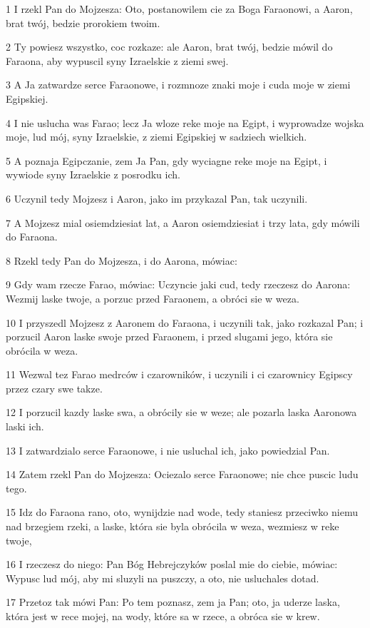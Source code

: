 \par 1 I rzekl Pan do Mojzesza: Oto, postanowilem cie za Boga Faraonowi, a Aaron, brat twój, bedzie prorokiem twoim.
\par 2 Ty powiesz wszystko, coc rozkaze: ale Aaron, brat twój, bedzie mówil do Faraona, aby wypuscil syny Izraelskie z ziemi swej.
\par 3 A Ja zatwardze serce Faraonowe, i rozmnoze znaki moje i cuda moje w ziemi Egipskiej.
\par 4 I nie uslucha was Farao; lecz Ja wloze reke moje na Egipt, i wyprowadze wojska moje, lud mój, syny Izraelskie, z ziemi Egipskiej w sadziech wielkich.
\par 5 A poznaja Egipczanie, zem Ja Pan, gdy wyciagne reke moje na Egipt, i wywiode syny Izraelskie z posrodku ich.
\par 6 Uczynil tedy Mojzesz i Aaron, jako im przykazal Pan, tak uczynili.
\par 7 A Mojzesz mial osiemdziesiat lat, a Aaron osiemdziesiat i trzy lata, gdy mówili do Faraona.
\par 8 Rzekl tedy Pan do Mojzesza, i do Aarona, mówiac:
\par 9 Gdy wam rzecze Farao, mówiac: Uczyncie jaki cud, tedy rzeczesz do Aarona: Wezmij laske twoje, a porzuc przed Faraonem, a obróci sie w weza.
\par 10 I przyszedl Mojzesz z Aaronem do Faraona, i uczynili tak, jako rozkazal Pan; i porzucil Aaron laske swoje przed Faraonem, i przed slugami jego, która sie obrócila w weza.
\par 11 Wezwal tez Farao medrców i czarowników, i uczynili i ci czarownicy Egipscy przez czary swe takze.
\par 12 I porzucil kazdy laske swa, a obrócily sie w weze; ale pozarla laska Aaronowa laski ich.
\par 13 I zatwardzialo serce Faraonowe, i nie usluchal ich, jako powiedzial Pan.
\par 14 Zatem rzekl Pan do Mojzesza: Ociezalo serce Faraonowe; nie chce puscic ludu tego.
\par 15 Idz do Faraona rano, oto, wynijdzie nad wode, tedy staniesz przeciwko niemu nad brzegiem rzeki, a laske, która sie byla obrócila w weza, wezmiesz w reke twoje,
\par 16 I rzeczesz do niego: Pan Bóg Hebrejczyków poslal mie do ciebie, mówiac: Wypusc lud mój, aby mi sluzyli na puszczy, a oto, nie usluchales dotad.
\par 17 Przetoz tak mówi Pan: Po tem poznasz, zem ja Pan; oto, ja uderze laska, która jest w rece mojej, na wody, które sa w rzece, a obróca sie w krew.
